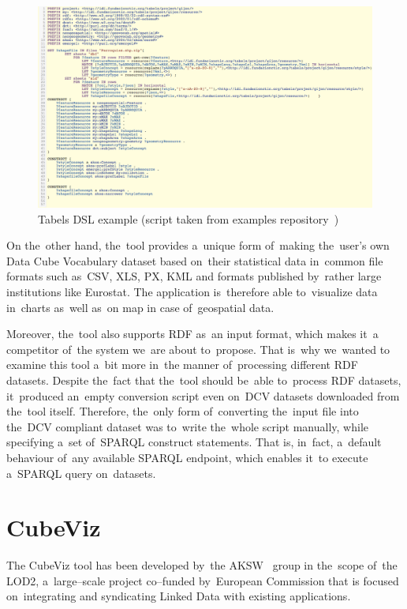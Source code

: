 \begin{figure}
	\centering
	\includegraphics[width=140mm]{img/tabels.png}
	\caption{Tabels DSL example (script taken from examples repository~\cite{tabels-web})}
	\label{fig:tabels}
\end{figure}

On the~other hand, the~tool provides a~unique form of~making the~user's own Data Cube 
Vocabulary dataset based on~their statistical data in~common file formats such as~CSV, XLS, PX, KML and formats published by~rather large institutions like Eurostat. 
The application is~therefore able to~visualize data in~charts as~well as~on map 
in case of~geospatial data.

Moreover, the~tool also supports RDF as~an input format, which makes it~a 
competitor of~the system we~are about to~propose. That is~why we~wanted
to examine this tool a~bit more in~the manner of~processing different RDF 
datasets. Despite the~fact that the~tool should be~able to~process RDF 
datasets, it~produced an~empty conversion script even on~DCV datasets downloaded 
from the~tool itself. Therefore, the~only form of~converting the~input file into 
the~DCV compliant dataset was to~write the~whole script manually, while 
specifying a~set of~SPARQL construct statements. That is, in~fact, a~default 
behaviour of~any available SPARQL endpoint, which enables it~to execute a~SPARQL 
query on~datasets.

\section{CubeViz}
\label{cubeviz}
The CubeViz tool has been developed by~the AKSW~\cite{aksw} group
in the~scope of~the LOD2,
a~large--scale project co--funded by~European Commission that is
focused on~integrating and syndicating Linked Data with existing applications.

